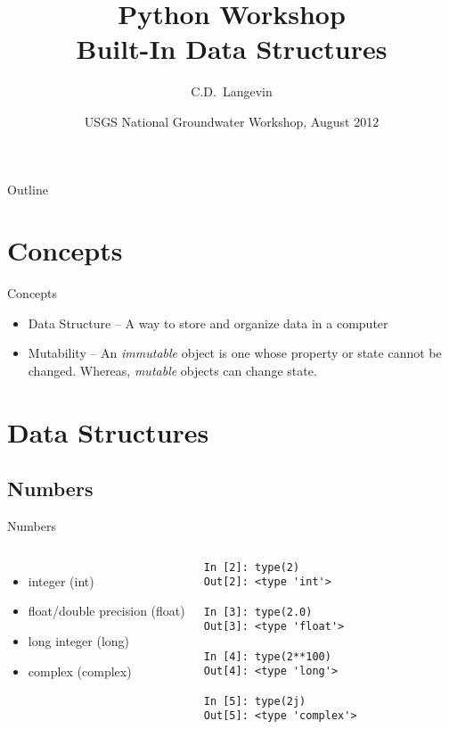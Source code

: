 \documentclass{beamer}
\title[]{Python Workshop\\
Built-In Data Structures}
\author[Langevin] %
{C.D.~Langevin}
\institute[USGS] %
{
  U.S. Geological Survey\\
  Reston, Virginia, USA
  }
\date[UQ12] %
{USGS National Groundwater Workshop, August 2012}
\begin{document}
\begin{frame}
  \titlepage
\end{frame}

\begin{frame}{Outline}
\tableofcontents
\end{frame}

\section{Concepts}
\begin{frame}[fragile]{Concepts}
\begin{itemize}
\item{Data Structure -- A way to store and organize data in a computer}
\item{Mutability -- An \emph{immutable} object is one whose property or state cannot be changed.  Whereas, \emph{mutable} objects can change state.}
\end{itemize}
\end{frame}


\section{Data Structures}

\subsection{Numbers}

\begin{frame}[fragile]{Numbers}
\begin{columns}[c]
\column{2.5in}
\begin{itemize}
\item{integer (int)}
\item{float/double precision (float)}
\item{long integer (long)}
\item{complex (complex)}
\end{itemize}

\column{2.5in}
\begin{lstlisting}
In [2]: type(2)
Out[2]: <type 'int'>

In [3]: type(2.0)
Out[3]: <type 'float'>

In [4]: type(2**100)
Out[4]: <type 'long'>

In [5]: type(2j)
Out[5]: <type 'complex'>
\end{lstlisting}
\end{columns}
\end{frame}
\end{document}
